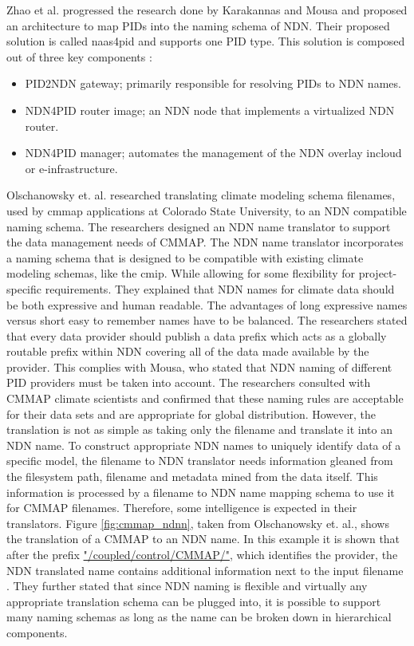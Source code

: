 Zhao et al. progressed the research done by Karakannas \cite{icn-bd} and Mousa \cite{ndn-app-aware} and proposed an architecture to map PIDs into the naming schema of NDN. Their proposed solution is called \gls{naas4pid} and supports one PID type. This solution is composed out of three key components \cite{koulouzis2018information}:
\begin{itemize}
  \item PID2NDN gateway; primarily responsible for resolving PIDs to NDN names.
  \item NDN4PID router image; an NDN node that implements a virtualized NDN router.
  \item NDN4PID manager; automates the management of the NDN overlay in\newline cloud or e-infrastructure.
\end{itemize}

Olschanowsky et. al. researched translating climate modeling schema filenames, used by \gls{cmmap} applications at Colorado State University, to an NDN compatible 
naming schema. The researchers designed an NDN name translator to support the data management needs of CMMAP. The NDN name translator incorporates a naming schema that is designed to be compatible with existing climate modeling schemas, like the \gls{cmip}. While allowing for some flexibility for project-specific requirements. They explained that NDN names for climate data should be both expressive and human readable. The advantages of long expressive names versus short easy to remember names have to be balanced.
The researchers stated that every data provider should publish a data prefix which acts as a globally
routable prefix within NDN covering all of the data made available by the provider. This complies with Mousa, who stated that NDN naming of different PID providers must be taken into account. The researchers consulted with CMMAP climate scientists and confirmed that these naming rules are acceptable for their data sets and are appropriate for global distribution. 
However, the translation is not as simple as taking only the filename and translate it into an NDN name. To construct appropriate NDN names to uniquely identify data of a specific model, the filename to NDN translator needs information gleaned from the filesystem path, filename and metadata mined from the data itself. This information is processed by a filename to NDN name mapping schema to use it for CMMAP filenames. Therefore, some intelligence is expected in their translators.
Figure \ref{fig:cmmap_ndnn}, taken from Olschanowsky et. al., shows the translation of a CMMAP to an NDN name. In this example it is shown that after the prefix \url{"/coupled/control/CMMAP/"}, which identifies the provider, the NDN translated name contains additional information next to the input filename \cite{ndn-clim}.
They further stated that since NDN naming is flexible and virtually any appropriate translation schema can be plugged into, it is possible to support many naming schemas as long as the name can be broken down in hierarchical components.

